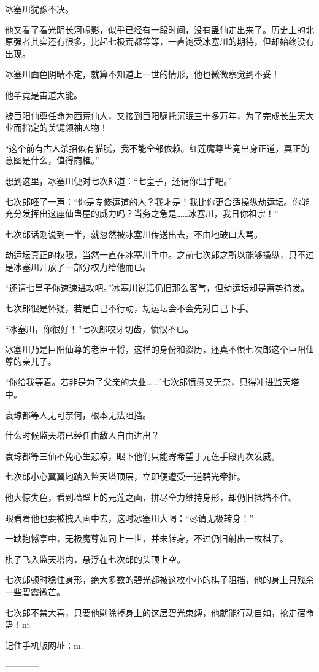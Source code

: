 \begin{this_body}
冰塞川犹豫不决。

他又看了看光阴长河虚影，似乎已经有一段时间，没有蛊仙走出来了。历史上的北原强者其实还有很多，比起七极荒都等等，一直饱受冰塞川的期待，但却始终没有出现。

冰塞川面色阴晴不定，就算不知道上一世的情形，他也微微察觉到不妥！

他毕竟是宙道大能。

被巨阳仙尊任命为西荒仙人，又接到巨阳嘱托沉眠三十多万年，为了完成长生天大业而指定的关键领袖人物！

“这个前有古人杀招似有猫腻，我不能全部依赖。红莲魔尊毕竟出身正道，真正的意图是什么，值得商榷。”

想到这里，冰塞川便对七次郎道：“七皇子，还请你出手吧。”

七次郎呸了一声：“你是专修运道的人？我才是！我比你更合适操纵劫运坛。你能充分发挥出这座仙蛊屋的威力吗？当务之急是……冰塞川，我日你祖宗！”

七次郎话刚说到一半，就忽然被冰塞川传送出去，不由地破口大骂。

劫运坛真正的权限，当然一直在冰塞川手中。之前七次郎之所以能够操纵，只不过是冰塞川开放了一部分权力给他而已。

“还请七皇子你速速进攻吧。”冰塞川说话仍旧那么客气，但劫运坛却是蓄势待发。

七次郎很是怀疑，若是自己不行动，劫运坛会不会先对自己下手。

“冰塞川，你很好！”七次郎咬牙切齿，愤恨不已。

冰塞川乃是巨阳仙尊的老臣干将，这样的身份和资历，还真不惧七次郎这个巨阳仙尊的亲儿子。

“你给我等着。若非是为了父亲的大业……”七次郎愤懑又无奈，只得冲进监天塔中。

袁琼都等人无可奈何，根本无法阻挡。

什么时候监天塔已经任由敌人自由进出？

袁琼都等三仙不免心生悲凉，眼下他们只能寄希望于元莲手段再次发威。

七次郎小心翼翼地踏入监天塔顶层，立即便遭受一道碧光牵扯。

他大惊失色，看到墙壁上的元莲之画，拼尽全力维持身形，却仍旧抵挡不住。

眼看着他也要被拽入画中去，这时冰塞川大喝：“尽请无极转身！”

一缺抱憾亭中，无极魔尊如同上一世，并未转身，不过仍旧射出一枚棋子。

棋子飞入监天塔内，悬浮在七次郎的头顶上空。

七次郎顿时稳住身形，绝大多数的碧光都被这枚小小的棋子阻挡，他的身上只残余一些碧霞微芒。

七次郎不禁大喜，只要他剿除掉身上的这层碧光束缚，他就能行动自如，抢走宿命蛊！nt

记住手机版网址：m.

------------

\end{this_body}

